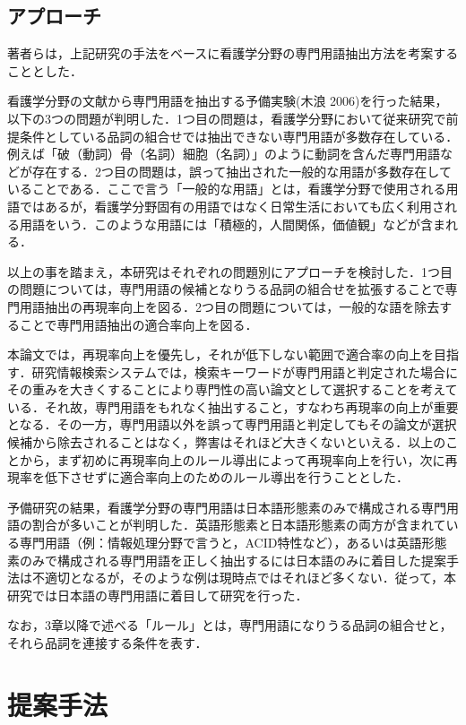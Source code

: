 \documentclass[japanese]{jnlp_1.4}
\begin{document}
\subsection{アプローチ}

著者らは，上記研究の手法をベースに看護学分野の専門用語抽出方法を考案することとした．

看護学分野の文献から専門用語を抽出する予備実験(木浪 2006)を行った結果，以下の3つの問題が判明した．1つ目の問題は，看護学分野において従来研究で前提条件としている品詞の組合せでは抽出できない専門用語が多数存在している．例えば「破（動詞）骨（名詞）細胞（名詞）」のように動詞を含んだ専門用語などが存在する．2つ目の問題は，誤って抽出された一般的な用語が多数存在していることである．ここで言う「一般的な用語」とは，看護学分野で使用される用語ではあるが，看護学分野固有の用語ではなく日常生活においても広く利用される用語をいう．このような用語には「積極的，人間関係，価値観」などが含まれる．

以上の事を踏まえ，本研究はそれぞれの問題別にアプローチを検討した．1つ目の問題については，専門用語の候補となりうる品詞の組合せを拡張することで専門用語抽出の再現率向上を図る．2つ目の問題については，一般的な語を除去することで専門用語抽出の適合率向上を図る．

本論文では，再現率向上を優先し，それが低下しない範囲で適合率の向上を目指す．研究情報検索システムでは，検索キーワードが専門用語と判定された場合にその重みを大きくすることにより専門性の高い論文として選択することを考えている．それ故，専門用語をもれなく抽出すること，すなわち再現率の向上が重要となる．その一方，専門用語以外を誤って専門用語と判定してもその論文が選択候補から除去されることはなく，弊害はそれほど大きくないといえる．以上のことから，まず初めに再現率向上のルール導出によって再現率向上を行い，次に再現率を低下させずに適合率向上のためのルール導出を行うこととした．

予備研究の結果，看護学分野の専門用語は日本語形態素のみで構成される専門用語の割合が多いことが判明した．英語形態素と日本語形態素の両方が含まれている専門用語（例：情報処理分野で言うと，ACID特性など），あるいは英語形態素のみで構成される専門用語を正しく抽出するには日本語のみに着目した提案手法は不適切となるが，そのような例は現時点ではそれほど多くない．従って，本研究では日本語の専門用語に着目して研究を行った．

なお，3章以降で述べる「ルール」とは，専門用語になりうる品詞の組合せと，それら品詞を連接する条件を表す．

\section{提案手法}
\end{document}
